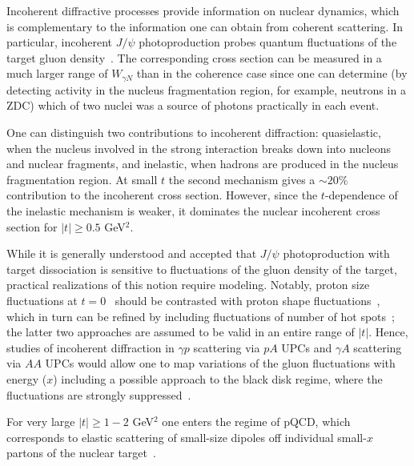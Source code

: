 \documentclass[../report.tex]{subfiles}
\begin{document}

Incoherent diffractive processes provide information on nuclear dynamics,  which is complementary to the 
information one can obtain from 
coherent scattering. In particular, incoherent $J/\psi$ photoproduction  probes quantum fluctuations of the target gluon density~\cite{Frankfurt:2008vi,Mantysaari:2016ykx,Mantysaari:2016jaz,Mantysaari:2017dwh,Cepila:2016uku,Cepila:2017nef}.
The corresponding cross section can be measured in a much larger range of $W_{\gamma N}$ than in the coherence case since one can 
determine  (by detecting activity in the nucleus fragmentation region, for example, neutrons in a ZDC) which of two nuclei was a source of photons practically in each event.

One can distinguish two contributions to incoherent diffraction: 
quasielastic, when the nucleus involved in the strong interaction breaks down into nucleons and nuclear fragments, 
and inelastic, when hadrons are produced in the nucleus fragmentation  region.
At small $t$ the second  mechanism gives a $\sim 20\% $ contribution to the incoherent cross section. However, since the $t$-dependence of the inelastic  mechanism is weaker, it dominates the nuclear incoherent cross section for $|t| \ge 0.5$ GeV$^2$. 

While it is generally understood and accepted that $J/\psi$ photoproduction with target dissociation is sensitive to fluctuations
of the gluon density of the target, practical realizations of this notion require modeling. Notably, 
proton size fluctuations at $t=0$~\cite{Frankfurt:2008vi} should be contrasted with proton shape fluctuations~\cite{Mantysaari:2016ykx,Mantysaari:2016jaz,Mantysaari:2017dwh}, which in turn
can be refined by including fluctuations of number of hot spots~\cite{Cepila:2016uku,Cepila:2017nef}; the latter two approaches 
are assumed to be valid in an entire range of $|t|$.
Hence, studies of incoherent diffraction
in $\gamma p$ scattering via $pA$ UPCs and $\gamma A$ scattering via $AA$ UPCs would allow one to map variations of the gluon fluctuations with energy ($x$) including a possible approach to the black disk regime, where the 
fluctuations are strongly suppressed~\cite{Cepila:2016uku}.

For very large $|t| \ge 1 - 2$ GeV$^2$ one enters the regime of pQCD, which corresponds to elastic scattering of small-size dipoles
off individual small-$x$ partons of the nuclear target~\cite{Frankfurt:2008et,Frankfurt:2008er}.
\end{document}

